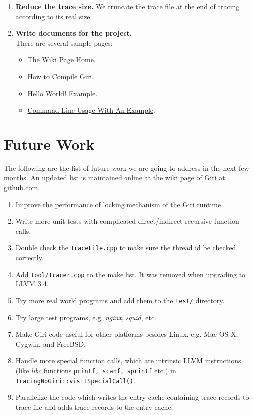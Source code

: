 \documentclass[DIV=calc, paper=a4, fontsize=11pt, twocolumn]{scrartcl}
\begin{document}
\begin{enumerate}
	\item \textbf{Reduce the trace size.}
		We truncate the trace file at the end of tracing according to its real size.
	\item \textbf{Write documents for the project.}\\
		There are several sample pages:
		\begin{itemize}
			\item \href{https://github.com/liuml07/giri/wiki}{The Wiki Page Home}.
			\item \href{https://github.com/liuml07/giri/wiki/How-to-Compile-Giri}{How to Compile Giri}.
			\item \href{https://github.com/liuml07/giri/wiki/Hello-World}{Hello World! Example}.
			\item \href{https://github.com/liuml07/giri/wiki/Example-Usage}{Command Line Usage With An Example}.
		\end{itemize}
\end{enumerate}

\section{Future Work}
The following are the list of future work we are going to address in the next few months.
An updated list is maintained online at the \href{https://github.com/liuml07/giri/wiki/TODO}{wiki page of Giri at github.com}.
\label{sec:todo}
\begin{enumerate}
	\item Improve the performance of locking mechanism of the Giri runtime.
	\item Write more unit tests with complicated direct/indirect recursive function calls.
	\item Double check the \texttt{TraceFile.cpp} to make sure the thread id be checked correctly.
	\item Add \texttt{tool/Tracer.cpp} to the make list. It was removed when upgrading to LLVM 3.4.
	\item Try more real world programs and add them to the \texttt{test/} directory.
	\item Try large test programs, e.g. \emph{nginx}, \emph{squid}, etc.
	\item Make Giri code useful for other platforms besides Linux, e.g. Mac OS X, Cygwin, and FreeBSD.
	\item Handle more special function calls, which are intrinsic LLVM instructions (like \emph{libc} functions \texttt{printf, scanf, sprintf} etc.) in \texttt{TracingNoGiri::visitSpecialCall()}.
	\item Parallelize the code which writes the entry cache containing trace records to trace file and adds trace records to the entry cache.
\end{enumerate}
\end{document}
